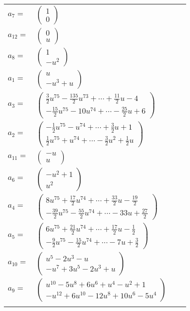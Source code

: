 \documentclass[1p]{elsarticle_modified}
\theoremstyle{definition}
\begin{document}
\begin{tabular}{m{7pt} m{180pt} m{7pt} m{180pt} }
\flushright $a_{7}=$&$\begin{pmatrix}1\\0\end{pmatrix}$ \\
\flushright $a_{12}=$&$\begin{pmatrix}0\\u\end{pmatrix}$ \\
\flushright $a_{8}=$&$\begin{pmatrix}1\\- u^2\end{pmatrix}$ \\
\flushright $a_{1}=$&$\begin{pmatrix}u\\- u^3+u\end{pmatrix}$ \\
\flushright $a_{3}=$&$\begin{pmatrix}\frac{3}{2} u^{75}-\frac{135}{2} u^{73}+\cdots+\frac{11}{2} u-4\\-\frac{15}{2} u^{75}-10 u^{74}+\cdots-\frac{25}{2} u+6\end{pmatrix}$ \\
\flushright $a_{2}=$&$\begin{pmatrix}-\frac{1}{2} u^{75}- u^{74}+\cdots+\frac{3}{2} u+1\\\frac{1}{2} u^{75}+u^{74}+\cdots-\frac{3}{2} u^2+\frac{1}{2} u\end{pmatrix}$ \\
\flushright $a_{11}=$&$\begin{pmatrix}- u\\u\end{pmatrix}$ \\
\flushright $a_{6}=$&$\begin{pmatrix}- u^2+1\\u^2\end{pmatrix}$ \\
\flushright $a_{4}=$&$\begin{pmatrix}8 u^{75}+\frac{17}{2} u^{74}+\cdots+\frac{33}{2} u-\frac{19}{2}\\-\frac{39}{2} u^{75}-\frac{55}{2} u^{74}+\cdots-33 u+\frac{27}{2}\end{pmatrix}$ \\
\flushright $a_{5}=$&$\begin{pmatrix}6 u^{75}+\frac{21}{2} u^{74}+\cdots+\frac{17}{2} u-\frac{1}{2}\\-\frac{9}{2} u^{75}-\frac{15}{2} u^{74}+\cdots-7 u+\frac{3}{2}\end{pmatrix}$ \\
\flushright $a_{10}=$&$\begin{pmatrix}u^5-2 u^3- u\\- u^7+3 u^5-2 u^3+u\end{pmatrix}$ \\
\flushright $a_{9}=$&$\begin{pmatrix}u^{10}-5 u^8+6 u^6+u^4- u^2+1\\- u^{12}+6 u^{10}-12 u^8+10 u^6-5 u^4\end{pmatrix}$\\&\end{tabular}
\end{document}
